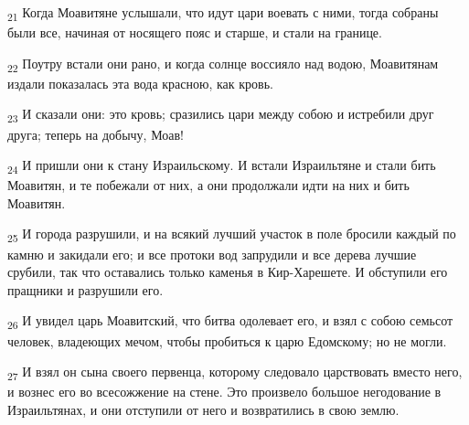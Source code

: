 \begin{tcolorbox}
\textsubscript{21} Когда Моавитяне услышали, что идут цари воевать с ними, тогда собраны были все, начиная от носящего пояс и старше, и стали на границе.
\end{tcolorbox}
\begin{tcolorbox}
\textsubscript{22} Поутру встали они рано, и когда солнце воссияло над водою, Моавитянам издали показалась эта вода красною, как кровь.
\end{tcolorbox}
\begin{tcolorbox}
\textsubscript{23} И сказали они: это кровь; сразились цари между собою и истребили друг друга; теперь на добычу, Моав!
\end{tcolorbox}
\begin{tcolorbox}
\textsubscript{24} И пришли они к стану Израильскому. И встали Израильтяне и стали бить Моавитян, и те побежали от них, а они продолжали идти на них и бить Моавитян.
\end{tcolorbox}
\begin{tcolorbox}
\textsubscript{25} И города разрушили, и на всякий лучший участок в поле бросили каждый по камню и закидали его; и все протоки вод запрудили и все дерева лучшие срубили, так что оставались только каменья в Кир-Харешете. И обступили его пращники и разрушили его.
\end{tcolorbox}
\begin{tcolorbox}
\textsubscript{26} И увидел царь Моавитский, что битва одолевает его, и взял с собою семьсот человек, владеющих мечом, чтобы пробиться к царю Едомскому; но не могли.
\end{tcolorbox}
\begin{tcolorbox}
\textsubscript{27} И взял он сына своего первенца, которому следовало царствовать вместо него, и вознес его во всесожжение на стене. Это произвело большое негодование в Израильтянах, и они отступили от него и возвратились в свою землю.
\end{tcolorbox}
